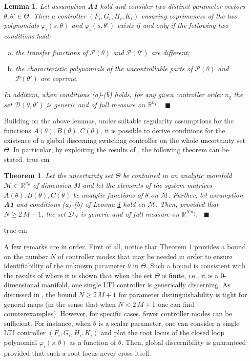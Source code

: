\documentclass[letterpaper, 10 pt, conference]{ieeetran}
\def\qedp{\hspace*{\fill}~{\tiny $\blacksquare$}}
\def\salt{\vskip 0.2 true cm}
\newtheorem{theorem}{Theorem}
\newtheorem{itlemma}{Lemma}
\newenvironment{lemma}{\begin{itlemma}\rm}{\end{itlemma}}
\begin{document}
\begin{lemma} \label{lem:autp}
\cite{Ba13} Let assumption \textbf{A1} hold and consider two distinct parameter vectors $\theta, \theta' \in \Theta$. Then a  controller $(F_i, G_i, H_i, K_i)$ ensuring 
coprimeness of the two polynomials $\varphi_i(s,\theta)$ and $\varphi_i(s,\theta')$ exists if and only if 
the following two conditions hold:
\begin{enumerate}[(a)]
\item the transfer functions of $\mathcal P(\theta)$ and $\mathcal P(\theta')$
are different;
\item the characteristic polynomials of the uncontrollable parts of $\mathcal P(\theta)$ and $\mathcal P(\theta')$ are coprime.
\end{enumerate}
In addition, when conditions (a)-(b) holds, for any given controller order $n_\xi$ the set $\mathcal D(\theta,\theta')$ is generic and of full measure on $\mathbb R^{\bar n_\xi}$. 
\qedp
\end{lemma}  

Building on the above lemmas, under suitable regularity assumptions for the functions $A(\theta), B(\theta), C(\theta)$, it is possible to derive conditions for the existence of a global
discerning switching controller on the whole uncertainty set $\Theta$. In particular,  by exploiting the results of \cite{Sontag}, the following theorem can be stated. \salt

\begin{theorem} \label{thm1}
Let the uncertainty set $\Theta$ be contained in an analytic manifold $\mathcal M \subset \mathbb R^{n_\theta}$ of dimension $M$ and let the elements of the system matrices 
$A(\theta), B(\theta), C(\theta)$ be analytic functions of $\theta$ on $\mathcal M$. Further, let assumption \textbf{A1} and conditions (a)-(b) of Lemma \ref{lem:autp} hold on $\mathcal M$.
Then, provided that $N \ge 2 \, M + 1$, the set $\mathcal D_N$ is generic and of full measure on $\mathbb R^{N \, \bar n_\xi}$.
\qedp
\end{theorem} \salt

A few remarks are in order. First of all, notice that Theorem \ref{thm1} provides a bound on the number $N$ of controller modes
that may be needed in order to ensure identifiability of the unknown parameter $\theta$ in $\Theta$. Such a bound is consistent with the results of \cite{Ba13,BaBaTe14} where it is shown
that when the set $\Theta$ is finite, i.e., it is a $0$-dimensional manifold, one single LTI controller is generically discerning. As discussed in  \cite{Sontag}, the bound
$N \ge 2 \, M + 1$ for parameter distinguishability is tight for general maps (in the sense that when $N < 2 \, M + 1$ one can find counterexamples). However,
for specific cases, fewer controller modes can be sufficient. For instance, when $\theta$ is a scalar parameter, one can consider a single LTI controller $(F_i, G_i, H_i, K_i)$ 
and plot the root locus of the closed loop polynomial $\varphi_i(s,\theta)$ as a function of $\theta$. Then, global discernibility is guaranteed provided that such a root locus never cross itself.
\end{document}
